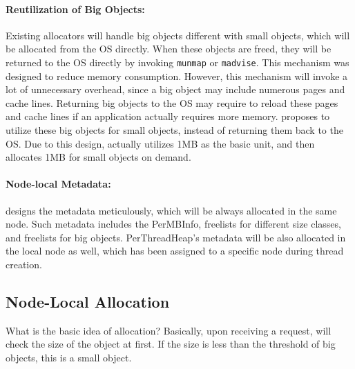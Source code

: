 \paragraph{Reutilization of Big Objects:} Existing allocators will handle big objects different with small objects, which will be allocated from the OS directly. When these objects are freed, they will be returned to the OS directly by invoking \texttt{munmap} or \texttt{madvise}. This mechanism was designed to reduce memory consumption. However, this mechanism will invoke a lot of unnecessary overhead, since a big object may include numerous pages and cache lines.  Returning big objects to the OS may require to reload these pages and cache lines if an application actually requires more memory.  
\NM{} proposes to utilize these big objects for small objects, instead of returning them back to the OS. Due to this design, \NM{} actually utilizes 1MB as the basic unit, and then allocates 1MB for small objects on demand. 

\paragraph{Node-local Metadata:} \NM{} designs the metadata meticulously, which will be always allocated in the same node. Such metadata includes the PerMBInfo, freelists for different size classes, and freelists for big objects. PerThreadHeap's metadata will be also allocated in the local node as well, which has been assigned to a specific node during thread creation. 


\subsection{Node-Local Allocation}

What is the basic idea of allocation? 
Basically, upon receiving a request, \NM{} will check the size of the object at first. If the size is less than the threshold of big objects, this is a small object. 

